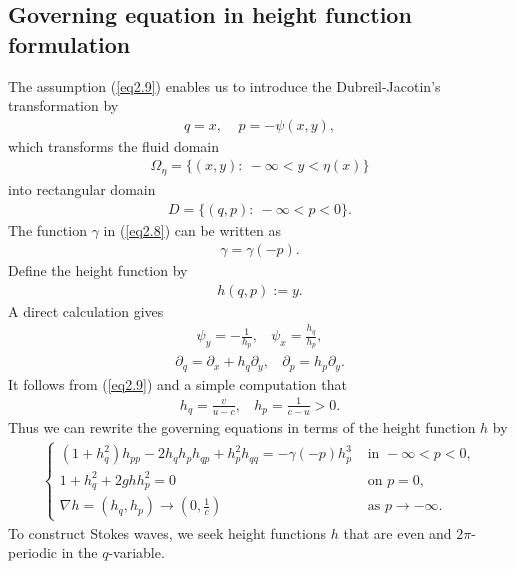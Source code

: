 \documentclass[11pt,reqno]{amsart}
\numberwithin{equation}{section}
\theoremstyle{definition}
\theoremstyle{remark}
\begin{document}
\subsection{Governing equation in height function formulation}

The assumption (\ref{eq2.9}) enables us to introduce the
Dubreil-Jacotin's transformation by
\begin{eqnarray}
q=x,~~~~~p=-\psi(x,y), \label{eq2.10}
\end{eqnarray}
which transforms the fluid domain
\begin{eqnarray}
{\Omega_{\eta}=\{(x,y):~-\infty<y<\eta(x)\}} \nonumber
\end{eqnarray}
into rectangular domain
\begin{eqnarray}
D=\{(q,p):~ -\infty< p< 0\}. \nonumber
\end{eqnarray}
The function $\gamma$ in (\ref{eq2.8}) can be written as
\begin{eqnarray}
\gamma=\gamma(-p). \label{eq2.11}
\end{eqnarray}
Define the height function by
\begin{eqnarray}
h(q,p):=y. \label{eq2.12}
\end{eqnarray}
A direct calculation gives
\begin{eqnarray}
\psi_{y}=-\frac{1}{h_{p}},~~~~ \psi_{x}=\frac{h_{q}}{h_{p}},
\label{eq2.13}
\end{eqnarray}
\begin{eqnarray}
\partial_{q}=\partial_{x}+h_{q}\partial_{y},~~~~ \partial_{p}=h_{p}\partial_{y}. \label{eq2.14}
\end{eqnarray}
It follows from (\ref{eq2.9}) and a simple computation that
\begin{eqnarray}
h_{q}=\frac{v}{u-c},~~~~ h_{p}=\frac{1}{c-u}>0. \label{eq2.15}
\end{eqnarray}
Thus we can rewrite the governing equations in terms of the height
function $h$ by
\begin{eqnarray}
\left\{\begin{array}{lll}{\left(1+h_{q}^{2}\right) h_{p p}-2 h_{q} h_{p} h_{q p}+h_{p}^{2} h_{q q}=-\gamma(-p)h_{p}^{3}}  & {\text { in } -\infty<p<0}, \\
{1+h_{q}^{2}+2ghh_{p}^{2}=0} & {\text { on } p=0}, \\
{\nabla h=(h_q, h_p)\rightarrow (0, \frac{1}{c})} & {\text { as }
p\rightarrow -\infty}.\end{array}\right. \label{eq2.16}
\end{eqnarray}
To construct Stokes waves, we seek height functions $h$ that are even
and $2\pi$-periodic in the $q$-variable.
\end{document}
